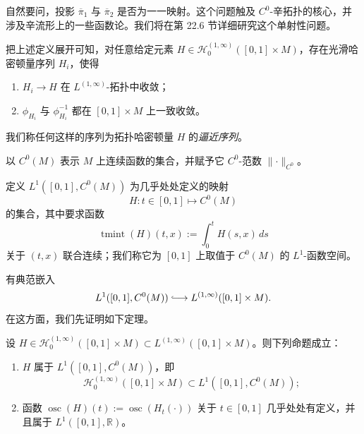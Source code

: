 自然要问，投影 $\overline\pi_1$ 与 $\overline\pi_2$ 是否为一一映射。这个问题触及
$C^0$-辛拓扑的核心，并涉及辛流形上的一些函数论。我们将在第 22.6 节详细研究这个单射性问题。

把上述定义展开可知，对任意给定元素
$H\in\mathcal H_0^{(1,\infty)}([0,1]\times M)$，存在光滑哈密顿量序列
$H_i$，使得
\begin{enumerate}[label=(\arabic*)]
 \item $H_i\to H$ 在 $L^{(1,\infty)}$-拓扑中收敛；
 \item $\phi_{H_i}$ 与 $\phi_{H_i}^{-1}$ 都在 $[0,1]\times M$ 上一致收敛。
\end{enumerate}
我们称任何这样的序列为拓扑哈密顿量 $H$ 的\emph{逼近序列}。

以 $C^0(M)$ 表示 $M$ 上连续函数的集合，并赋予它
$C^0$-范数 $\|\mathord\cdot\|_{C^0}$。

\begin{definition}\label{def:l1-c0-valued-functions}
定义 $L^1([0,1],C^0(M))$ 为几乎处处定义的映射
\[
 H:t\in[0,1]\longmapsto C^0(M)
\]
的集合，其中要求函数
\[
 \operatorname{tmint}(H)(t,x):=\int_0^t H(s,x)\,ds
\]
关于 $(t,x)$ 联合连续；我们称它为 $[0,1]$ 上取值于
$C^0(M)$ 的 $L^1$-函数空间。
\end{definition}

有典范嵌入
\[
 L^1([0,1],C^0(M))\lhook\joinrel\longrightarrow
 L^{(1,\infty)}([0,1]\times M).
\]
在这方面，我们先证明如下定理。

\begin{theorem}\label{thm:topological-hamiltonian-l1-c0}
设
$H\in\mathcal H_0^{(1,\infty)}([0,1]\times M)
\subset L^{(1,\infty)}([0,1]\times M)$。则下列命题成立：
\begin{enumerate}[label=(\arabic*)]
 \item $H$ 属于 $L^1([0,1],C^0(M))$，即
 \[
  \mathcal H_0^{(1,\infty)}([0,1]\times M)
  \subset L^1([0,1],C^0(M));
 \]
 \item 函数
 $\operatorname{osc}(H)(t):=\operatorname{osc}(H_t(\mathord\cdot))$
 关于 $t\in[0,1]$ 几乎处处有定义，并且属于
 $L^1([0,1],\mathbb R)$。
\end{enumerate}
\end{theorem}

